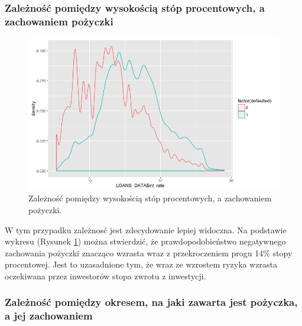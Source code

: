 \subsubsection{Zależność pomiędzy wysokością stóp procentowych, a zachowaniem pożyczki}

\begin{figure}[h] \centering %
	\includegraphics[scale=0.5]{img/int_defaulted.png}
	\caption{Zależność pomiędzy wysokością stóp procentowych, a zachowaniem pożyczki.}
	\label{lc:int_defaulted}
\end{figure}

W tym przypadku zależnosć jest zdecydowanie lepiej widoczna. Na podstawie wykresu (Rysunek \ref{lc:int_defaulted}) można stwierdzić, że prawdopodobieństwo negatywnego zachowania pożyczki znacząco wzrasta wraz z przekroczeniem progu 14\% stopy procentowej. Jest to uzasadnione tym, że wraz ze wzrostem ryzyka wzrasta oczekiwana przez inwestorów stopa zwrotu z inwestycji.

\subsubsection{Zależność pomiędzy okresem, na jaki zawarta jest pożyczka, a jej zachowaniem}

